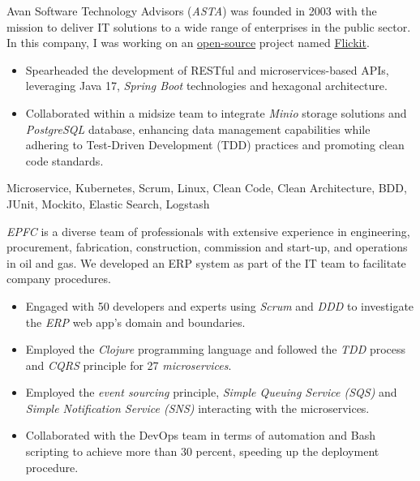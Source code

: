 \vspace*{-10pt}
\begin{experiences}
{
  Avan Software Technology Advisors (\emph{ASTA}) was founded in 2003 with the mission to deliver IT solutions to a wide range of enterprises in the public sector. In this company, I was working on an \href{https://github.com/flickit-platform/flickit-assessment}{open-source} project named \href{https://flickit.org/}{Flickit}.
  \begin{itemize}
    \item Spearheaded the development of RESTful and microservices-based APIs, leveraging Java 17, \emph{Spring Boot} technologies and hexagonal architecture.
    \item Collaborated within a midsize team to integrate \emph{Minio} storage solutions and \emph{PostgreSQL} database, enhancing data management capabilities while adhering to Test-Driven Development (TDD) practices and promoting clean code standards. \end{itemize}}
  {Microservice, Kubernetes, Scrum, Linux, Clean Code, Clean Architecture, BDD, JUnit, Mockito, Elastic Search, Logstash} 
 \emptySeparator
 {
   \emph{EPFC} is a diverse team of professionals with extensive experience in engineering, procurement, fabrication, construction, commission and start-up, and operations in oil and gas. We developed an ERP system as part of the IT team to facilitate company procedures.
   \begin{itemize}
   \item Engaged with 50 developers and experts using \emph{Scrum} and \emph{DDD} to investigate the \textit{ERP} web app's domain and boundaries.
   \item Employed the \emph{Clojure} programming language and followed the \emph{TDD} process and \textit{CQRS} principle for 27 \emph{microservices}.
   \item Employed the \textit{event sourcing} principle, \textit{Simple Queuing Service (SQS)} and \textit{Simple Notification Service (SNS)} interacting with the microservices.
   \item Collaborated with the DevOps team in terms of automation and Bash scripting to achieve more than 30 percent, speeding up the deployment procedure.

\end{itemize}}
\end{experiences}

